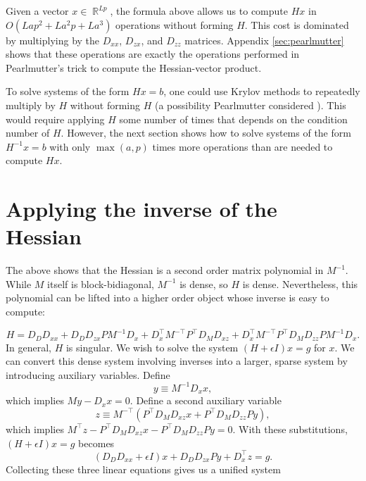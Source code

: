\documentclass{article}
\newcommand{\R}{\mathop{\mathbb{R}}}
\begin{document}
Given a vector $x \in \R^{Lp}$, the formula above allows us to compute $H x$ in
$O\left(Lap^2 + L a^2p +La^3\right)$ operations without forming $H$. This cost
is dominated by multiplying by the $D_{xx}$, $D_{zx}$, and $D_{zz}$ matrices.
Appendix \ref{sec:pearlmutter} shows that these operations are exactly the
operations performed in Pearlmutter's trick to compute the
Hessian-vector product.

To solve systems of the form $H x = b$, one could use Krylov methods to
repeatedly multiply by $H$ without forming $H$ (a possibility Pearlmutter
considered \cite{pearlmutter94}).  This would require applying $H$ some number
of times that depends on the condition number of $H$. However, the next section
shows how to solve systems of the form $H^{-1} x = b$ with only $\max(a,p)$
times more operations than are needed to compute $H x$.

\section{Applying the inverse of the Hessian}

The above shows that the Hessian is a second order matrix polynomial in
$M^{-1}$. While $M$ itself is block-bidiagonal, $M^{-1}$ is dense, so $H$ is
dense. Nevertheless, this polynomial can be lifted into a higher order object
whose inverse is easy to compute:

\[
  H  = D_D D_{xx}  + D_D D_{zx} P M^{-1} D_x + D_x^\top M^{-\top} P^\top D_M D_{xz} + D_x^\top M^{-\top} P^\top D_M D_{zz} P M^{-1} D_x.
\]
In general, $H$ is singular. We wish to solve the system $(H + \epsilon I ) x = g$ for $x$. We can convert this dense system
involving inverses into a larger, sparse system by introducing auxiliary
variables. Define
\begin{equation}
  y \equiv M^{-1} D_x x,
\end{equation}
which implies $M y - D_x x = 0$.  Define a second auxiliary variable
\begin{equation}
  z \equiv M^{-\top} \left( P^\top D_M D_{xz} x + P^\top D_M D_{zz} P y \right),
\end{equation}
which implies $M^\top z - P^\top D_M D_{xz} x - P^\top D_M D_{zz} P y = 0$.
With these substitutions, $(H + \epsilon I) x = g$ becomes
\begin{equation}
  \left(D_D D_{xx} + \epsilon I\right) x + D_D D_{zx} P y + D_x^\top z = g.
\end{equation}
Collecting these three linear equations gives us a unified system
\end{document}
